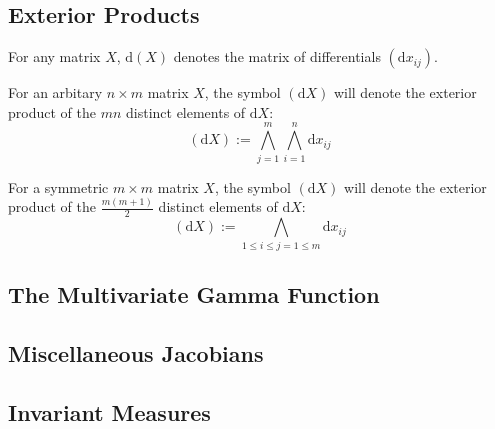 \subsection{Exterior Products}
For any matrix $X$, $\mathrm{d}(X)$ denotes the matrix of differentials $(\mathrm{d}x_{ij})$.\par 
For an arbitary $n\times m$ matrix $X$, the symbol $(\mathrm{d}X)$ will denote the exterior product of the $mn$ distinct elements of $\mathrm{d}X$:
\[(\mathrm{d}X):=\bigwedge _{j=1}^m \bigwedge _{i=1}^n \mathrm{d}x_{ij}\]\par 
For a symmetric $m\times m$ matrix $X$, the symbol $(\mathrm{d}X)$ will denote the exterior product of the $\frac{m(m+1)}{2}$ distinct elements of $\mathrm{d}X$:
\[(\mathrm{d}X):=\bigwedge _{1\le i\le j=1\le m} \mathrm{d}x_{ij}\]\par 


\subsection{The Multivariate Gamma Function}

\subsection{Miscellaneous Jacobians}

\subsection{Invariant Measures}